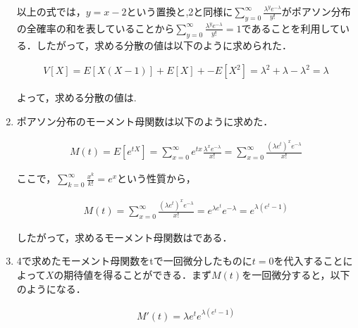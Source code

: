 \documentclass[a4paper,10pt]{jarticle}
\begin{document}
\begin{enumerate}
	以上の式では，$y=x-2$という置換と,2と同様に$\sum_{y = 0}^{\infty}\frac{{\lambda}^y e^{-\lambda}}{y!}$がポアソン分布の全確率の和を表していることから$\sum_{y = 0}^{\infty}\frac{{\lambda}^y e^{-\lambda}}{y!}= 1$であることを利用している．したがって，求める分散の値は以下のように求められた．

	\begin{equation}
		\label{equ3}
		\begin{split}
		V[X] = E[X(X-1)] + E[X] +- E[X^2] = {\lambda}^2 + \lambda - {\lambda}^2 = \lambda
		\end{split}
	\end{equation}

よって，求める分散の値は.

	 \vspace{6mm}


	 \item ポアソン分布のモーメント母関数は以下のように求めた．
	 
	 \begin{equation}
		\label{equ4}
		\begin{split}
		M(t) = E[e^{tX}] = \sum_{x = 0}^{\infty}e^{tx}\frac{{\lambda}^x e^{-\lambda}}{x!} = \sum_{x = 0}^{\infty}\frac{{(\lambda e^t)}^x e^{-\lambda}}{x!} 
		\end{split}
	\end{equation}
	 
	ここで，$\sum_{k = 0}^{\infty}\frac{x^k}{k!} = e^x$という性質から，

	\begin{equation}
		\label{equ5}
		\begin{split}
		M(t) = \sum_{x = 0}^{\infty}\frac{{(\lambda e^t)}^x e^{-\lambda}}{x!} = e^{\lambda e^t}e^{-\lambda} = e^{\lambda(e^t-1)}
		\end{split}
	\end{equation}

	 したがって，求めるモーメント母関数はである．

	 \vspace{6mm}


	 \item  4で求めたモーメント母関数をtで一回微分したものに$t=0$を代入することによって$X$の期待値を得ることができる．まず$M(t)$を一回微分すると，以下のようになる．
	 
	 \begin{equation}
		\label{equ6}
		\begin{split}
		M'(t) = \lambda e^t e^{\lambda(e^t-1)}
		\end{split}
	\end{equation}


\end{enumerate}
\end{document}
